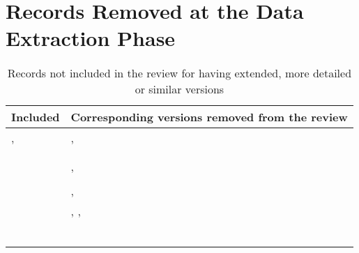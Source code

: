 \section{Records Removed at the Data Extraction Phase}
\label{a1:rmv-records}

\begin{table*}[!h]
  \renewcommand{\arraystretch}{1.25}
  \setlength{\tabcolsep}{3pt}
  \caption[Records not included in the review for having extended, more detailed or similar versions]{Records not included in the review for having extended, more detailed or similar versions}
  \vspace{0.5em}
  \label{tab:a1:rmv-records}
  \centering
  {\scriptsize
  \begin{tabular}{l l}

\hline
\textbf{Included} & \textbf{Corresponding versions removed from the review}\\
\hline
\cite{hochdorfer-et-al:2009:5339626}, \cite{hochdorfer-schlegel:2009} &
\cite{hochdorfer-schlegel:2009:5354433}, \cite{hochdorfer-schlegel:2010:5651229}\\
\cite{dayoub-et-al:2011:013} &
\cite{dayoub-duckett:2008:4650701}\\
\cite{kretzschmar-stachniss:2012:0278364912455072} & \cite{kretzschmar-et-al:2011:6048060}\\
\cite{latif-et-al:2012:6385879} &
\cite{latif-et-al:2013:030}, \cite{latif-et-al:2013:0278364913498910}\\
\cite{maddern-et-al:2012:6224622} & \cite{maddern-et-al:2013:036}\\
\cite{bacca-et-al:2013:003} &
\cite{bacca-et-al:2010:291}, \cite{bacca-et-al:2011:008}\\
\cite{kawewong-et-al:2013:826410} & 
\cite{kawewong-et-al:2010:2587}, \cite{kawewong-et-al:2011:0278364910371855}, \cite{kawewong-et-al:2011:007}\\
\cite{paul-newman:2013:0278364913509859} &
\cite{paul-newman:2011:5980404}\\
\cite{carlevaris-bianco-et-al:2014:2347571} &
\cite{carlevaris-bianco-eustice:2013:6696478}\\
\cite{neubert-et-al:2015:005} &
\cite{neubert-et-al:2013:6698842}\\
\cite{ozog-et-al:2016:21582} &
\cite{ozog-eustice:2014:6907415}\\
\cite{biswas-veloso:2017:005} &
\cite{biswas-veloso:2014:6907435}\\
\cite{griffith-pradalier:2017:21664} &
\cite{griffith-pradalier:2016:1}\\

\end{tabular}}
\end{table*}
